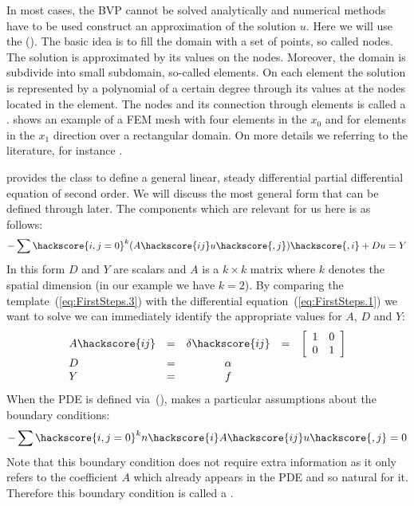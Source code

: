 In most cases, the BVP cannot be solved analytically and numerical
methods have to be used construct an approximation of the solution
$u$. Here we will use the 
(). The basic idea is to fill the domain with a set of
points, so called nodes. The solution is approximated by its values on
the nodes. Moreover, the domain is subdivide into small subdomain,
so-called elements. On each element the solution is represented by a
polynomial of a certain degree through its values at the nodes located
in the element. The nodes and its connection through elements is
called a .   shows an example
of a FEM mesh with four elements in the $x_0$ and for elements in the
$x_1$ direction over a rectangular domain. On more details we referring
to the literature, for instance \cite{X1,X2,X3}.

\escript provides the class \linearPDE to define a
general linear, steady differential partial differential equation of
second order. We will discuss the most general form that can be
defined through  later. The components which are
relevant for us here is as follows:
\begin{equation}
-\sum\hackscore{i,j=0}^k (A\hackscore{ij}
 u\hackscore{,j})\hackscore{,i} + D u = Y
\label{eq:FirstSteps.3}
\end{equation}
In this form $D$ and $Y$ are scalars and $A$ is a $k \times k$ matrix
where $k$ denotes the spatial dimension (in our example we have
$k=2$).  By comparing the template~(\ref{eq:FirstSteps.3}) with the
differential equation~(\ref{eq:FirstSteps.1}) we want to solve we can
immediately identify the appropriate values for $A$, $D$ and $Y$:
\begin{equation}
\begin{array}{lcccc}
A\hackscore{ij} & = & \delta\hackscore{ij}&  =&
                 \left[
                                  \begin{array}{cc}
                                  1 & 0\\
                                  0 & 1
                                  \end{array}
                 \right] \\
D & =& \alpha \\
Y & = & f \\
\end{array}
\label{eq:FirstSteps.3.1}
\end{equation}
When the PDE is defined via~(), 
makes a particular assumptions about the boundary conditions:
\begin{equation}
-\sum\hackscore{i,j=0}^k n\hackscore{i} A\hackscore{ij}
 u\hackscore{,j} = 0
\label{eq:FirstSteps.4}
\end{equation}
Note that this boundary condition does not require extra information
as it only refers to the coefficient $A$ which already appears in the
PDE and so natural for it. Therefore this boundary condition is called
a .


